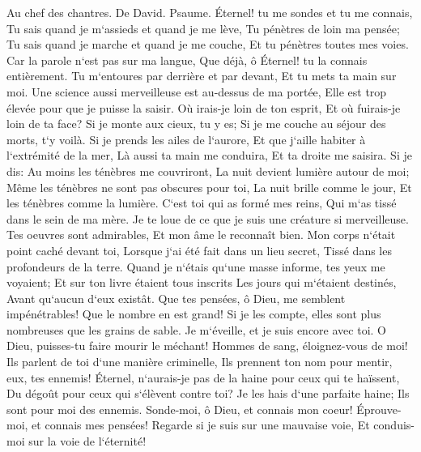 \verse Au chef des chantres. De David. Psaume. Éternel! tu me sondes et tu me connais, 
\verse Tu sais quand je m`assieds et quand je me lève, Tu pénètres de loin ma pensée; 
\verse Tu sais quand je marche et quand je me couche, Et tu pénètres toutes mes voies. 
\verse Car la parole n`est pas sur ma langue, Que déjà, ô Éternel! tu la connais entièrement. 
\verse Tu m`entoures par derrière et par devant, Et tu mets ta main sur moi. 
\verse Une science aussi merveilleuse est au-dessus de ma portée, Elle est trop élevée pour que je puisse la saisir. 
\verse Où irais-je loin de ton esprit, Et où fuirais-je loin de ta face? 
\verse Si je monte aux cieux, tu y es; Si je me couche au séjour des morts, t`y voilà. 
\verse Si je prends les ailes de l`aurore, Et que j`aille habiter à l`extrémité de la mer, 
\verse Là aussi ta main me conduira, Et ta droite me saisira. 
\verse Si je dis: Au moins les ténèbres me couvriront, La nuit devient lumière autour de moi; 
\verse Même les ténèbres ne sont pas obscures pour toi, La nuit brille comme le jour, Et les ténèbres comme la lumière. 
\verse C`est toi qui as formé mes reins, Qui m`as tissé dans le sein de ma mère. 
\verse Je te loue de ce que je suis une créature si merveilleuse. Tes oeuvres sont admirables, Et mon âme le reconnaît bien. 
\verse Mon corps n`était point caché devant toi, Lorsque j`ai été fait dans un lieu secret, Tissé dans les profondeurs de la terre. 
\verse Quand je n`étais qu`une masse informe, tes yeux me voyaient; Et sur ton livre étaient tous inscrits Les jours qui m`étaient destinés, Avant qu`aucun d`eux existât. 
\verse Que tes pensées, ô Dieu, me semblent impénétrables! Que le nombre en est grand! 
\verse Si je les compte, elles sont plus nombreuses que les grains de sable. Je m`éveille, et je suis encore avec toi. 
\verse O Dieu, puisses-tu faire mourir le méchant! Hommes de sang, éloignez-vous de moi! 
\verse Ils parlent de toi d`une manière criminelle, Ils prennent ton nom pour mentir, eux, tes ennemis! 
\verse Éternel, n`aurais-je pas de la haine pour ceux qui te haïssent, Du dégoût pour ceux qui s`élèvent contre toi? 
\verse Je les hais d`une parfaite haine; Ils sont pour moi des ennemis. 
\verse Sonde-moi, ô Dieu, et connais mon coeur! Éprouve-moi, et connais mes pensées! 
\verse Regarde si je suis sur une mauvaise voie, Et conduis-moi sur la voie de l`éternité! 

\chapter{}

